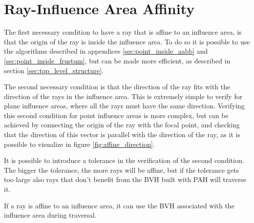 \documentclass{PoliMi_MasterThesis}
\begin{document}
\section{Ray-Influence Area Affinity} \label{sec:ray_influence_area_affinity}
The first necessary condition to have a ray that is affine to an influence area, is that the origin of the ray is inside the influence area. To do so it is possible to use the algorithms described in appendices \ref{sec:point_inside_aabb} and \ref{sec:point_inside_frustum}, but can be made more efficient, as described in section \ref{sec:top_level_structure}.

The second necessary condition is that the direction of the ray fits with the direction of the rays in the influence area. This is extremely simple to verify for plane influence areas, where all the rays must have the same direction. Verifying this second condition for point influence areas is more complex, but can be achieved by connecting the origin of the ray with the focal point, and checking that the direction of this vector is parallel with the direction of the ray, as it is possible to visualize in figure \ref{fig:affine_direction}.

It is possible to introduce a tolerance in the verification of the second condition. The bigger the tolerance, the more rays will be affine, but if the tolerance gets too large also rays that don't benefit from the BVH built with PAH will traverse it.

If a ray is affine to an influence area, it can use the BVH associated with the influence area during traversal.
\end{document}
